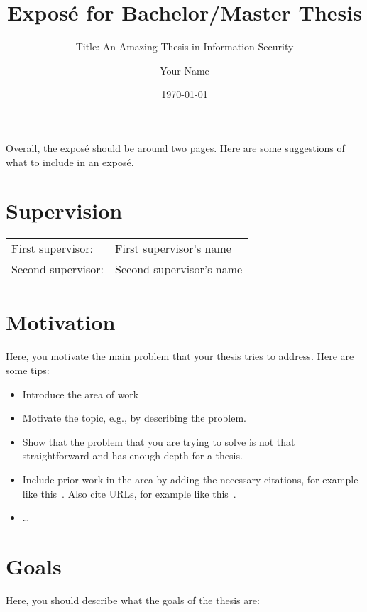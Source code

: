 \documentclass{scrartcl}
\title{Exposé for Bachelor/Master Thesis}
\subtitle{Title: An Amazing Thesis in Information Security}
\author{Your Name}
\date{\today}
\begin{document}
 
\maketitle


 
Overall, the exposé should be around two pages. Here are some suggestions of what to include in an exposé.


\section*{Supervision}


\begin{tabular}{ll}
First supervisor: & First supervisor's name \\
Second supervisor: & Second supervisor's name \\
\end{tabular}


\section*{Motivation}

Here, you motivate the main problem that your thesis tries to address. Here are some tips:
\begin{itemize}
 \item Introduce the area of work
 \item Motivate the  topic, e.g., by describing the problem.
 \item Show that the problem that you are trying to solve is not that straightforward and has enough depth for a thesis.
 \item Include prior work in the area by adding the necessary citations, for example like this~\cite{Shannon48}. Also cite URLs, for example like this~\cite{url}.
 \item \ldots
\end{itemize}



 
\section*{Goals}

Here, you should describe what the goals of the thesis are:
\end{document}
